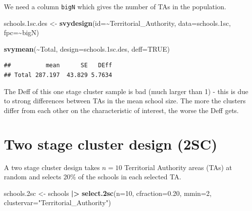 \documentclass[
]{book}
\newenvironment{Shaded}{\begin{snugshade}}{\end{snugshade}}
\newcommand{\AttributeTok}[1]{\textcolor[rgb]{0.13,0.29,0.53}{#1}}
\newcommand{\ConstantTok}[1]{\textcolor[rgb]{0.56,0.35,0.01}{#1}}
\newcommand{\DecValTok}[1]{\textcolor[rgb]{0.00,0.00,0.81}{#1}}
\newcommand{\FloatTok}[1]{\textcolor[rgb]{0.00,0.00,0.81}{#1}}
\newcommand{\FunctionTok}[1]{\textcolor[rgb]{0.13,0.29,0.53}{\textbf{#1}}}
\newcommand{\NormalTok}[1]{#1}
\newcommand{\OtherTok}[1]{\textcolor[rgb]{0.56,0.35,0.01}{#1}}
\newcommand{\SpecialCharTok}[1]{\textcolor[rgb]{0.81,0.36,0.00}{\textbf{#1}}}
\newcommand{\StringTok}[1]{\textcolor[rgb]{0.31,0.60,0.02}{#1}}
\begin{document}
We need a column \texttt{bigN} which gives the number of TAs in the population.

\begin{Shaded}
\begin{Highlighting}[]
\NormalTok{schools}\FloatTok{.1}\NormalTok{sc.des }\OtherTok{\textless{}{-}} \FunctionTok{svydesign}\NormalTok{(}\AttributeTok{id=}\SpecialCharTok{\textasciitilde{}}\NormalTok{Territorial\_Authority, }\AttributeTok{data=}\NormalTok{schools}\FloatTok{.1}\NormalTok{sc, }
                             \AttributeTok{fpc=}\SpecialCharTok{\textasciitilde{}}\NormalTok{bigN)}
\end{Highlighting}
\end{Shaded}

\begin{Shaded}
\begin{Highlighting}[]
\FunctionTok{svymean}\NormalTok{(}\SpecialCharTok{\textasciitilde{}}\NormalTok{Total, }\AttributeTok{design=}\NormalTok{schools}\FloatTok{.1}\NormalTok{sc.des, }\AttributeTok{deff=}\ConstantTok{TRUE}\NormalTok{)}
\end{Highlighting}
\end{Shaded}

\begin{verbatim}
##          mean      SE   DEff
## Total 287.197  43.829 5.7634
\end{verbatim}

The Deff of this one stage cluster sample is bad (much larger than 1) - this is due to
strong differences between TAs in the mean school size. The more the clusters differ from
each other on the characteristic of interest, the worse the Deff gets.

\section{Two stage cluster design (2SC)}\label{two-stage-cluster-design-2sc}

A two stage cluster design takes \(n=10\) Territorial Authority areas (TAs) at random
and selects 20\% of the schools in each selected TA.

\begin{Shaded}
\begin{Highlighting}[]
\NormalTok{schools}\FloatTok{.2}\NormalTok{sc }\OtherTok{\textless{}{-}}\NormalTok{ schools }\SpecialCharTok{|\textgreater{}} \FunctionTok{select.2sc}\NormalTok{(}\AttributeTok{n=}\DecValTok{10}\NormalTok{, }\AttributeTok{cfraction=}\FloatTok{0.20}\NormalTok{, }\AttributeTok{mmin=}\DecValTok{2}\NormalTok{, }
                                     \AttributeTok{clustervar=}\StringTok{"Territorial\_Authority"}\NormalTok{)}
\end{Highlighting}
\end{Shaded}
\end{document}
